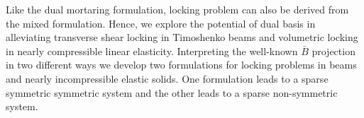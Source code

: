 Like the dual mortaring formulation, locking problem can also be derived from the mixed formulation. Hence, we explore the potential of \Bezier dual basis in alleviating transverse shear locking in Timoshenko beams and volumetric locking in nearly compressible linear elasticity. Interpreting the well-known $\bar{B}$ projection in two different ways we develop two formulations for locking problems in beams and nearly incompressible elastic solids.  One formulation leads to a sparse symmetric symmetric system and the other leads to a sparse non-symmetric system. 

